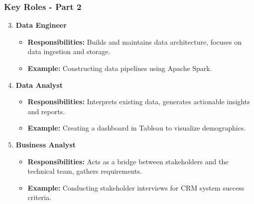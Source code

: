 \documentclass[aspectratio=169]{beamer}
\begin{document}
\begin{frame}[fragile]
    \frametitle{Key Roles - Part 2}
    \begin{enumerate}
        \setcounter{enumi}{2}
        \item \textbf{Data Engineer}
            \begin{itemize}
                \item \textbf{Responsibilities:} Builds and maintains data architecture, focuses on data ingestion and storage.
                \item \textbf{Example:} Constructing data pipelines using Apache Spark.
            \end{itemize}

        \item \textbf{Data Analyst}
            \begin{itemize}
                \item \textbf{Responsibilities:} Interprets existing data, generates actionable insights and reports.
                \item \textbf{Example:} Creating a dashboard in Tableau to visualize demographics.
            \end{itemize}
        
        \item \textbf{Business Analyst}
            \begin{itemize}
                \item \textbf{Responsibilities:} Acts as a bridge between stakeholders and the technical team, gathers requirements.
                \item \textbf{Example:} Conducting stakeholder interviews for CRM system success criteria.
            \end{itemize}
    \end{enumerate}
\end{frame}
\end{document}
